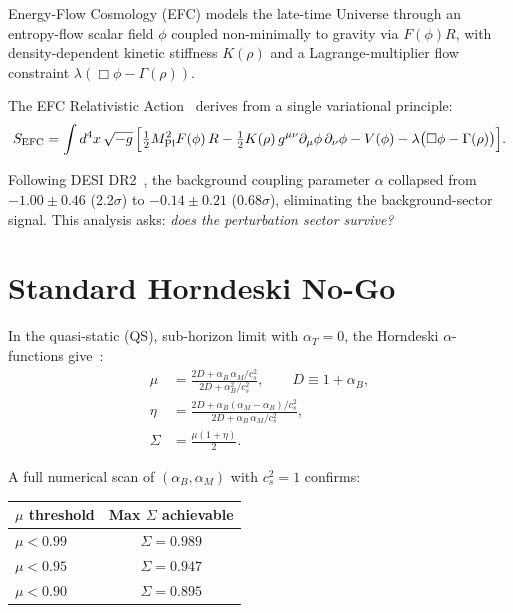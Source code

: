 \documentclass[11pt,a4paper]{article}
\begin{document}
Energy-Flow Cosmology (EFC) models the late-time Universe through an
entropy-flow scalar field $\phi$ coupled non-minimally to gravity via
$F(\phi)R$, with density-dependent kinetic stiffness $K(\rho)$ and a
Lagrange-multiplier flow constraint $\lambda(\Box\phi - \Gamma(\rho))$.

The EFC Relativistic Action~\cite{magnusson2026action} derives from a
single variational principle:
\begin{equation}\label{eq:action}
S_{\mathrm{EFC}} = \int d^4x\,\sqrt{-g}\,\Bigl[
  \tfrac{1}{2}M_{\mathrm{Pl}}^2 F(\phi)\,R
  - \tfrac{1}{2}K(\rho)\,g^{\mu\nu}\partial_\mu\phi\,\partial_\nu\phi
  - V(\phi)
  - \lambda\bigl(\Box\phi - \Gamma(\rho)\bigr)
\Bigr].
\end{equation}

Following DESI DR2~\cite{desi2025}, the background coupling parameter
$\alpha$ collapsed from $-1.00 \pm 0.46$ (2.2$\sigma$) to
$-0.14 \pm 0.21$ (0.68$\sigma$), eliminating the background-sector
signal.  This analysis asks: \emph{does the perturbation sector survive?}

\newpage
\section{Standard Horndeski No-Go}

In the quasi-static (QS), sub-horizon limit with $\alpha_T = 0$, the
Horndeski $\alpha$-functions give~\cite{pogosian2016}:
\begin{align}
\mu &= \frac{2D + \alpha_B\,\alpha_M / c_s^2}{2D + \alpha_B^2 / c_s^2},
  \qquad D \equiv 1 + \alpha_B, \label{eq:mu_qs}\\[4pt]
\eta &= \frac{2D + \alpha_B(\alpha_M - \alpha_B)/c_s^2}
             {2D + \alpha_B\,\alpha_M / c_s^2}, \label{eq:eta_qs}\\[4pt]
\Sigma &= \frac{\mu(1+\eta)}{2}. \label{eq:sigma_def}
\end{align}

A full numerical scan of $(\alpha_B, \alpha_M)$ with $c_s^2 = 1$ confirms:
\begin{center}
\begin{tabular}{@{}lc@{}}
\toprule
$\mu$ threshold & Max $\Sigma$ achievable \\
\midrule
$\mu < 0.99$ & $\Sigma = 0.989$ \\
$\mu < 0.95$ & $\Sigma = 0.947$ \\
$\mu < 0.90$ & $\Sigma = 0.895$ \\
\bottomrule
\end{tabular}
\end{center}
\end{document}
